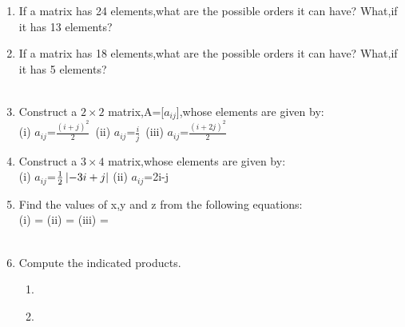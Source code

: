 \documentclass[journal,12pt,twocolumn]{IEEEtran}
\renewcommand\thesection{\arabic{section}}
\begin{document}
\begin{enumerate}[label=\thesection.\arabic*.,ref=\thesection.\theenumi]
\item If a matrix has 24 elements,what are the possible orders it can have? What,if it has 13 elements?\\
\solution 

\item If a matrix has 18 elements,what are the possible orders it can have? What,if it has 5 elements?\\
\\
\solution 

%
\item Construct a $2 \times 2$ matrix,A=[$a_{ij}$],whose elements are given by:\\
(i) $a_{ij}$=$\frac{(i+j)^2}{2}$\ (ii) $a_{ij}$=$\frac{i}{j}$\ (iii) $a_{ij}$=$\frac{(i+2j)^2}{2}$\\
\solution 

\item Construct a $3\times 4$ matrix,whose elements are given by:\\
(i) $a_{ij}$=$\frac{1}{2}\left\vert-3i+j\right\vert$ (ii) $a_{ij}$=2i-j\\
\solution 

\item Find the values of x,y and z from the following equations:\\
(i)  =  (ii)  =  (iii) =\\
\\
\solution 

\item Compute the indicated products.
\begin{enumerate}
\item {} \\
\solution 

\item {} 
\\
\solution 

\end{enumerate}
\end{enumerate}
\end{document}
